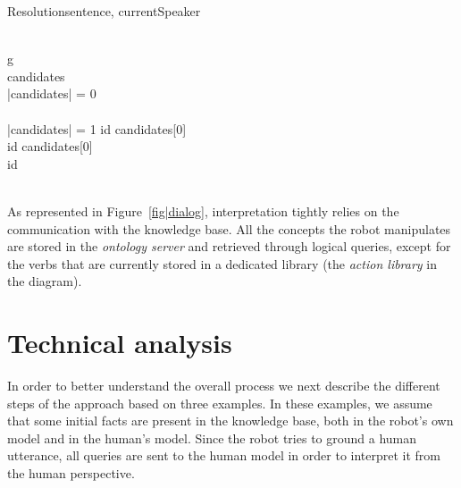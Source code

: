 \documentclass[twocolumn]{svjour3}
\begin{document}
\small
\begin{pseudocode}[ruled]{Resolution}{sentence, currentSpeaker}
\label{algo|Resolution}

 \GETS {} \\

\FOREACH g \in {} \DO 
\BEGIN
    \GETS {} \\
   candidates \GETS {} \\
   
   \IF \left|{candidates}\right| = 0 \THEN
    \BEGIN
       \\
      \EXIT \\
    \END
   \ELSEIF \left|{candidates}\right| = 1 \THEN
      id \GETS candidates[0]\\

   \ELSE
      \BEGIN
	\IF {} \THEN
	  id \GETS candidates[0] \\
	\ELSE
	  id \GETS {} \\
      \END \\
\END
\end{pseudocode}
\normalsize

As represented in Figure~\ref{fig|dialog}, interpretation tightly relies on the
communication with the knowledge base. All the concepts the robot manipulates
are stored in the \textit{ontology server} and retrieved through logical
queries, except for the verbs that are currently stored in a dedicated library
(the \emph{action library} in the diagram).

\section{Technical analysis}
\label{examples}


In order to better understand the overall process we next describe the
different steps of the approach based on three examples. In these examples, we
assume that some initial facts are present in the knowledge base, both in the
robot's own model and in the human's model.  Since the robot tries to ground a
human utterance, all queries are sent to the human model in order to interpret
it from the human perspective. 
\end{document}
